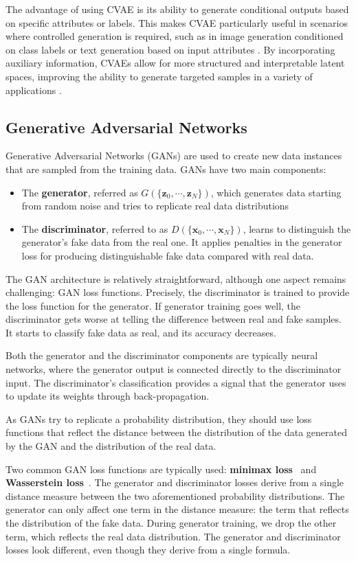\documentclass[sn-mathphys-num]{sn-jnl}%
\newcommand{\svec}[1]{\{\ensuremath{\vec{#1}_0, \cdots, \vec{#1}_N}\}}
\renewcommand\vec{\mathbf}
\begin{document}
\begin{itemize}
    The advantage of using CVAE is its ability to generate conditional outputs based on specific attributes or labels. This makes CVAE particularly useful in scenarios where controlled generation is required, such as in image generation conditioned on class labels or text generation based on input attributes \cite{kingma2014semi,yan2016attribute2image}. By incorporating auxiliary information, CVAEs allow for more structured and interpretable latent spaces, improving the ability to generate targeted samples in a variety of applications \cite{kingma2014semi}.
\end{itemize}


\color{black}
    \subsection{Generative Adversarial Networks}\label{sec:gan}
    Generative Adversarial Networks (GANs) are used to create new data instances that are sampled from the training data. GANs have two main components: 
    \begin{itemize}
        \item The \textbf{generator}, referred as $G(\svec{z})$, which generates data starting from random noise and tries to replicate real data distributions
        \item The \textbf{discriminator}, referred to as $D(\svec{x})$, learns to distinguish the generator's fake data from the real one. It applies penalties in the generator loss for producing distinguishable fake data compared with real data.
    \end{itemize}
    The GAN architecture is relatively straightforward, although one aspect remains challenging: GAN loss functions. Precisely, the discriminator is trained to provide the loss function for the generator. If generator training goes well, the discriminator gets worse at telling the difference between real and fake samples. It starts to classify fake data as real, and its accuracy decreases. 
    
    Both the generator and the discriminator components are typically neural networks, where the generator output is connected directly to the discriminator input. The discriminator's classification provides a signal that the generator uses to update its weights through back-propagation.\par
    As GANs try to replicate a probability distribution, they should use loss functions that reflect the distance between the distribution of the data generated by the GAN and the distribution of the real data. \par
    Two common GAN loss functions are typically used: \textbf{minimax loss}~\cite{minimax} and \textbf{Wasserstein loss}~\cite{Wasserstein}.
    The generator and discriminator losses derive from a single distance measure between the two aforementioned probability distributions. The generator can only affect one term in the distance measure: the term that reflects the distribution of the fake data. During generator training, we drop the other term, which reflects the real data distribution.
    The generator and discriminator losses look different, even though they derive from a single formula.
    
\end{document}
